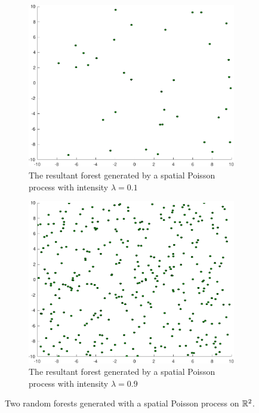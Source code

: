 \begin{figure}
  \begin{subfigure}[c]{0.5\textwidth}
    \includegraphics[width=.95\textwidth]{figures/experiments/poisson009}
    \caption{The resultant forest generated by a spatial Poisson process with
      intensity \(\lambda = 0.1\)}
    \label{fig:poisson009}
  \end{subfigure}%
  \begin{subfigure}[c]{0.5\textwidth}
    \includegraphics[width=.95\textwidth]{figures/experiments/poisson09}
    \caption{The resultant forest generated by a spatial Poisson process with
      intensity \(\lambda = 0.9\)}
    \label{fig:poisson09}
  \end{subfigure}
  \caption[Two random forests generated with a spatial Poisson process]{Two
    random forests generated with a spatial Poisson process on \(\mathbb{R}^{2}\).}
\end{figure}

